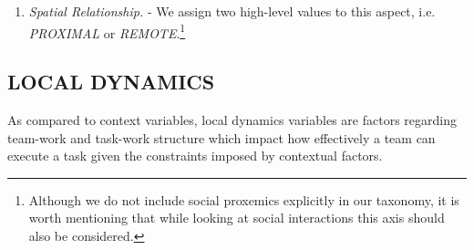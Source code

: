 \documentclass[letterpaper, 10 pt, conference]{ieeeconf}  %
\theoremstyle{definition}
\begin{document}
\begin{enumerate}
\begin{enumerate}
\begin{enumerate}
\begin{enumerate}
            \end{enumerate}
            \item \textit{Spatial Relationship.} \cite{Yanco2004updated, Goodrich2007, Fong2003} - 
            We assign two high-level values to this aspect, i.e. \textit{PROXIMAL} or \textit{REMOTE}.\footnote{Although we do not include social proxemics \cite{hall1963system} explicitly in our taxonomy, it is worth mentioning that while looking at social interactions this axis should also be considered.}
        \end{enumerate}
\end{enumerate}
\end{enumerate}

\subsection{LOCAL DYNAMICS}
As compared to context variables, local dynamics variables are factors regarding team-work and task-work structure \cite{Mathieu2000TheIO} which impact how effectively a team can execute a task given the constraints imposed by contextual factors.
\end{document}
